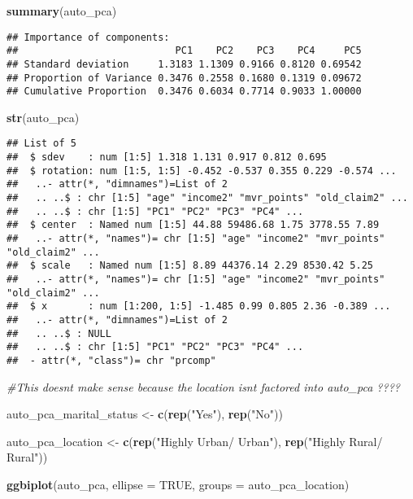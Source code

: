 \documentclass[]{article}
\newenvironment{Shaded}{\begin{snugshade}}{\end{snugshade}}
\newcommand{\KeywordTok}[1]{\textcolor[rgb]{0.13,0.29,0.53}{\textbf{#1}}}
\newcommand{\DataTypeTok}[1]{\textcolor[rgb]{0.13,0.29,0.53}{#1}}
\newcommand{\StringTok}[1]{\textcolor[rgb]{0.31,0.60,0.02}{#1}}
\newcommand{\CommentTok}[1]{\textcolor[rgb]{0.56,0.35,0.01}{\textit{#1}}}
\newcommand{\OtherTok}[1]{\textcolor[rgb]{0.56,0.35,0.01}{#1}}
\newcommand{\NormalTok}[1]{#1}
\begin{document}
\begin{Shaded}
\begin{Highlighting}[]
\KeywordTok{summary}\NormalTok{(auto_pca)}
\end{Highlighting}
\end{Shaded}

\begin{verbatim}
## Importance of components:
##                           PC1    PC2    PC3    PC4     PC5
## Standard deviation     1.3183 1.1309 0.9166 0.8120 0.69542
## Proportion of Variance 0.3476 0.2558 0.1680 0.1319 0.09672
## Cumulative Proportion  0.3476 0.6034 0.7714 0.9033 1.00000
\end{verbatim}

\begin{Shaded}
\begin{Highlighting}[]
\KeywordTok{str}\NormalTok{(auto_pca)}
\end{Highlighting}
\end{Shaded}

\begin{verbatim}
## List of 5
##  $ sdev    : num [1:5] 1.318 1.131 0.917 0.812 0.695
##  $ rotation: num [1:5, 1:5] -0.452 -0.537 0.355 0.229 -0.574 ...
##   ..- attr(*, "dimnames")=List of 2
##   .. ..$ : chr [1:5] "age" "income2" "mvr_points" "old_claim2" ...
##   .. ..$ : chr [1:5] "PC1" "PC2" "PC3" "PC4" ...
##  $ center  : Named num [1:5] 44.88 59486.68 1.75 3778.55 7.89
##   ..- attr(*, "names")= chr [1:5] "age" "income2" "mvr_points" "old_claim2" ...
##  $ scale   : Named num [1:5] 8.89 44376.14 2.29 8530.42 5.25
##   ..- attr(*, "names")= chr [1:5] "age" "income2" "mvr_points" "old_claim2" ...
##  $ x       : num [1:200, 1:5] -1.485 0.99 0.805 2.36 -0.389 ...
##   ..- attr(*, "dimnames")=List of 2
##   .. ..$ : NULL
##   .. ..$ : chr [1:5] "PC1" "PC2" "PC3" "PC4" ...
##  - attr(*, "class")= chr "prcomp"
\end{verbatim}

\begin{Shaded}
\begin{Highlighting}[]
\CommentTok{#This doesnt make sense because the location isnt factored into auto_pca ???? }


\NormalTok{auto_pca_marital_status <-}\StringTok{ }\KeywordTok{c}\NormalTok{(}\KeywordTok{rep}\NormalTok{(}\StringTok{"Yes"}\NormalTok{), }\KeywordTok{rep}\NormalTok{(}\StringTok{"No"}\NormalTok{))}

\NormalTok{auto_pca_location <-}\StringTok{ }\KeywordTok{c}\NormalTok{(}\KeywordTok{rep}\NormalTok{(}\StringTok{"Highly Urban/ Urban"}\NormalTok{), }\KeywordTok{rep}\NormalTok{(}\StringTok{"Highly Rural/ Rural"}\NormalTok{))}

\KeywordTok{ggbiplot}\NormalTok{(auto_pca, }\DataTypeTok{ellipse =} \OtherTok{TRUE}\NormalTok{, }\DataTypeTok{groups =}\NormalTok{ auto_pca_location)}
\end{Highlighting}
\end{Shaded}
\end{document}
